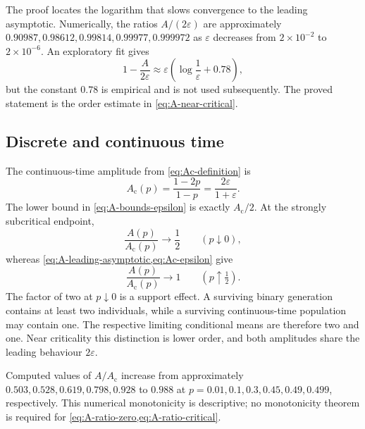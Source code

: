 The proof locates the logarithm that slows convergence to the leading asymptotic.
Numerically, the ratios \(A/(2\varepsilon)\) are approximately
\(0.90987,0.98612,0.99814,0.99977,0.999972\) as \(\varepsilon\) decreases from
\(2\times10^{-2}\) to \(2\times10^{-6}\).  An exploratory fit gives
\begin{equation}
  1-\frac{A}{2\varepsilon}
  \approx\varepsilon\left(\log\frac1\varepsilon+0.78\right),
  \label{eq:A-empirical-correction}
\end{equation}
but the constant \(0.78\) is empirical and is not used subsequently.  The proved
statement is the order estimate in \cref{eq:A-near-critical}.

\subsection{Discrete and continuous time}
\label{sec:A-discrete-continuous}

The continuous-time amplitude from \cref{eq:Ac-definition} is
\begin{equation}
  A_{\mathrm c}(p)=\frac{1-2p}{1-p}
  =\frac{2\varepsilon}{1+\varepsilon}.
  \label{eq:Ac-epsilon}
\end{equation}
The lower bound in \cref{eq:A-bounds-epsilon} is exactly
\(A_{\mathrm c}/2\).  At the strongly subcritical endpoint,
\begin{equation}
  \frac{A(p)}{A_{\mathrm c}(p)}\longrightarrow\frac12
  \qquad(p\downarrow0),
  \label{eq:A-ratio-zero}
\end{equation}
whereas \cref{eq:A-leading-asymptotic,eq:Ac-epsilon} give
\begin{equation}
  \frac{A(p)}{A_{\mathrm c}(p)}\longrightarrow1
  \qquad(p\uparrow\tfrac12).
  \label{eq:A-ratio-critical}
\end{equation}
The factor of two at \(p\downarrow0\) is a support effect.  A surviving binary
generation contains at least two individuals, while a surviving continuous-time
population may contain one.  The respective limiting conditional means are therefore
two and one.  Near criticality this distinction is lower order, and both amplitudes
share the leading behaviour \(2\varepsilon\).

Computed values of \(A/A_{\mathrm c}\) increase from approximately
\(0.503,0.528,0.619,0.798,0.928\) to \(0.988\) at
\(p=0.01,0.1,0.3,0.45,0.49,0.499\), respectively.  This numerical monotonicity is
descriptive; no monotonicity theorem is required for
\cref{eq:A-ratio-zero,eq:A-ratio-critical}.

